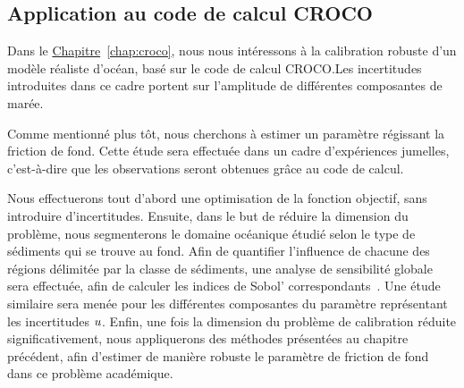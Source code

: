 \documentclass[../../Main_ManuscritThese.tex]{subfiles}
\newcommand{\frchap}[1]{\hyperref[#1]{Chapitre}~\ref{#1}}
\begin{document}
\subsection*{Application au code de calcul CROCO}
Dans le \frchap{chap:croco}, nous nous intéressons à la calibration
robuste d'un modèle réaliste d'océan, basé sur le code de calcul
CROCO.\@ Les incertitudes introduites dans ce cadre portent sur
l'amplitude de différentes composantes de marée.

Comme mentionné plus tôt, nous cherchons à estimer un paramètre
régissant la friction de fond. Cette étude sera effectuée dans un
cadre d'expériences jumelles, c'est-à-dire que les observations seront
obtenues grâce au code de calcul.

Nous effectuerons tout d'abord une optimisation de la fonction
objectif, sans introduire d'incertitudes. Ensuite, dans le but de
réduire la dimension du problème, nous segmenterons le domaine
océanique étudié selon le type de sédiments qui se trouve au
fond. Afin de quantifier l'influence de chacune des régions délimitée
par la classe de sédiments, une analyse de sensibilité globale sera
effectuée, afin de calculer les indices de Sobol'
correspondants~\cite{sobol_global_2001,iooss_revue_2011}. Une étude
similaire sera menée pour les différentes composantes du paramètre
représentant les incertitudes $u$.
Enfin, une fois la dimension du problème de calibration réduite
significativement, nous appliquerons des méthodes présentées au
chapitre précédent, afin d'estimer de manière robuste le paramètre de
friction de fond dans ce problème académique.

\markchapterend




\subfileLocal{
	\pagestyle{empty}
	
	
}
\end{document}
